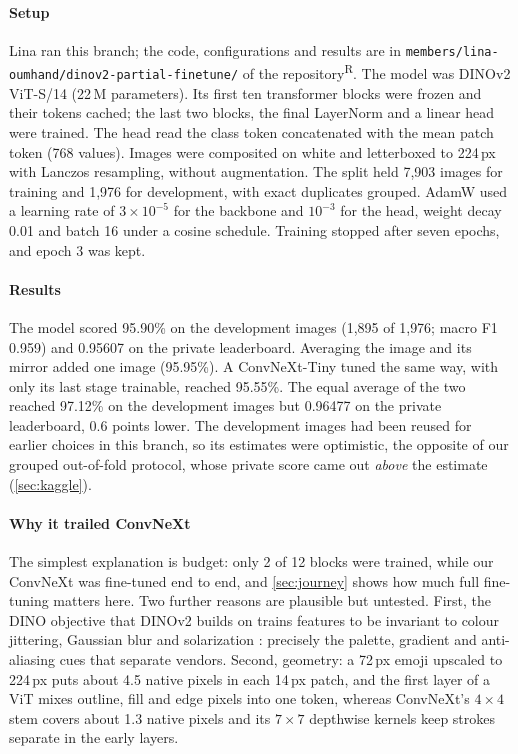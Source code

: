 \documentclass[11pt,a4paper]{article}
\newcommand{\rep}{\textsuperscript{\textcolor{reported}{\sffamily\scriptsize R}}}
\newcommand{\pct}[1]{#1\%}
\begin{document}
\paragraph{Setup} Lina ran this branch; the code, configurations and results are in \nolinkurl{members/lina-oumhand/dinov2-partial-finetune/} of the repository\rep. The model was DINOv2 ViT-S/14 (22\,M parameters). Its first ten transformer blocks were frozen and their tokens cached; the last two blocks, the final LayerNorm and a linear head were trained. The head read the class token concatenated with the mean patch token (768 values). Images were composited on white and letterboxed to 224\,px with Lanczos resampling, without augmentation. The split held 7{,}903 images for training and 1{,}976 for development, with exact duplicates grouped. AdamW used a learning rate of $3\times10^{-5}$ for the backbone and $10^{-3}$ for the head, weight decay 0.01 and batch 16 under a cosine schedule. Training stopped after seven epochs, and epoch 3 was kept.

\paragraph{Results} The model scored \pct{95.90} on the development images (1{,}895 of 1{,}976; macro F1 0.959) and 0.95607 on the private leaderboard. Averaging the image and its mirror added one image (\pct{95.95}). A ConvNeXt-Tiny tuned the same way, with only its last stage trainable, reached \pct{95.55}. The equal average of the two reached \pct{97.12} on the development images but 0.96477 on the private leaderboard, 0.6 points lower. The development images had been reused for earlier choices in this branch, so its estimates were optimistic, the opposite of our grouped out-of-fold protocol, whose private score came out \emph{above} the estimate (\cref{sec:kaggle}).

\paragraph{Why it trailed ConvNeXt} The simplest explanation is budget: only 2 of 12 blocks were trained, while our ConvNeXt was fine-tuned end to end, and \cref{sec:journey} shows how much full fine-tuning matters here. Two further reasons are plausible but untested. First, the DINO objective that DINOv2 builds on trains features to be invariant to colour jittering, Gaussian blur and solarization \cite{caron2021dino}: precisely the palette, gradient and anti-aliasing cues that separate vendors. Second, geometry: a 72\,px emoji upscaled to 224\,px puts about 4.5 native pixels in each 14\,px patch, and the first layer of a ViT mixes outline, fill and edge pixels into one token, whereas ConvNeXt's $4\times4$ stem covers about 1.3 native pixels and its $7\times7$ depthwise kernels keep strokes separate in the early layers.
\end{document}
